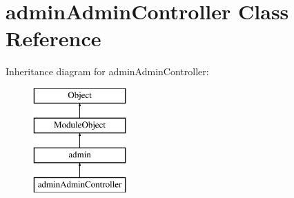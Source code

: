 \hypertarget{classadminAdminController}{\section{admin\+Admin\+Controller Class Reference}
\label{classadminAdminController}
}
Inheritance diagram for admin\+Admin\+Controller\+:\begin{figure}[H]
\begin{center}
\leavevmode
\includegraphics[height=4.000000cm]{classadminAdminController}
\end{center}
\end{figure}
